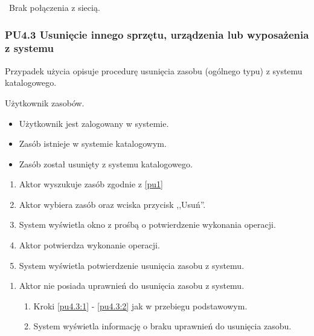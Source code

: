 \
Brak połączenia z siecią.

\subsubsection{PU4.3 Usunięcie innego sprzętu, urządzenia lub wyposażenia z systemu}

Przypadek użycia opisuje procedurę usunięcia zasobu (ogólnego typu) z systemu katalogowego.

Użytkownik zasobów.

\begin{itemize}
\item Użytkownik jest zalogowany w systemie.
\item Zasób istnieje w systemie katalogowym.
\end{itemize}

\begin{itemize}
\item Zasób został usunięty z systemu katalogowego.
\end{itemize}

\begin{enumerate}
\item \label{pu4.3:1} Aktor wyszukuje zasób zgodnie z \ref{pu1}
\item \label{pu4.3:2} Aktor wybiera zasób oraz wciska przycisk ,,Usuń''.
\item System wyświetla okno z prośbą o potwierdzenie wykonania operacji.
\item Aktor potwierdza wykonanie operacji.
\item System wyświetla potwierdzenie usunięcia zasobu z systemu.
\end{enumerate}

\begin{enumerate}
\item Aktor nie posiada uprawnień do usunięcia zasobu z systemu.
	\begin{enumerate}[label*=\arabic*.]
		\item Kroki \ref{pu4.3:1} - \ref{pu4.3:2} jak w przebiegu podstawowym.
		\item System wyświetla informację o braku uprawnień do usunięcia zasobu.
	\end{enumerate}
\end{enumerate}

